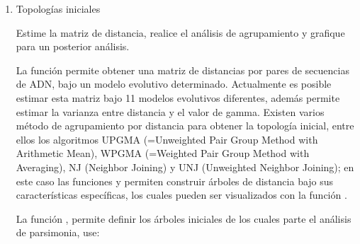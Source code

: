 \begin{itemize}
\begin{enumerate}

\item{Topolog\'ias iniciales}

Estime la matriz de distancia,  realice el an\'alisis de agrupamiento y grafique para un posterior an\'alisis.



La funci\'on  permite obtener una matriz de distancias por pares de secuencias de ADN,  bajo un modelo evolutivo determinado. 
Actualmente es posible estimar esta matriz bajo 11 modelos evolutivos diferentes,  adem\'as permite estimar la varianza entre distancia y el valor de gamma. Existen varios m\'etodo de agrupamiento por distancia para obtener la topolog\'ia inicial,  entre ellos los algoritmos UPGMA (=Unweighted Pair Group Method with Arithmetic Mean),  WPGMA (=Weighted Pair Group Method with Averaging),  NJ (Neighbor Joining) y UNJ (Unweighted Neighbor Joining); en este caso las funciones  y  permiten construir \'arboles de distancia bajo sus caracter\'isticas espec\'ificas,  los cuales pueden ser visualizados con la funci\'on .

La funci\'on  , permite definir los \'arboles iniciales de los cuales parte el an\'alisis de parsimonia, use:



\end{enumerate}
\end{itemize}
